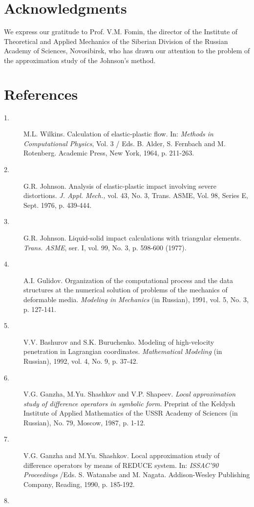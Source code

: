 \section*{Acknowledgments}
\hspace{6mm}
   We express our gratitude to Prof. V.M. Fomin, the director of the Institute
of Theoretical and Applied Mechanics of the Siberian Division of the Russian
Academy of Sciences, Novosibirsk, who has drawn our attention to the problem
of the approximation study of the Johnson's method.

\section*{References}
\begin{description}
\item[ 1.]
M.L. Wilkins. Calculation of elastic-plastic flow. In: {\em Methods in
Computational Physics}, Vol. 3 / Eds. B. Alder, S. Fernbach and M. Rotenberg.
Academic Press, New York, 1964, p. 211-263.
\item[ 2.]
G.R. Johnson. Analysis of elastic-plastic impact involving severe
distortions. {\em J. Appl. Mech.,} vol. 43, No. 3, Trans. ASME, Vol. 98,
Series E, Sept. 1976, p. 439-444.
\item[ 3.]
G.R. Johnson. Liquid-solid impact calculations with triangular elements.
{\em Trans. ASME}, ser. I, vol. 99, No. 3, p. 598-600 (1977).
\item[ 4.]
A.I. Gulidov. Organization of the computational process and the data
structures at the numerical solution of problems of the mechanics of deformable
media. {\em Modeling in Mechanics} (in Russian), 1991, vol. 5, No. 3, p. 127-141.
\item[ 5.]
V.V. Bashurov and S.K. Buruchenko. Modeling of high-velocity penetration in
Lagrangian coordinates. {\em Mathematical Modeling} (in Russian), 1992, vol. 4,
No. 9, p. 37-42.
\item[ 6.]
V.G. Ganzha, M.Yu. Shashkov and V.P. Shapeev. {\em Local approximation study
of difference operators in symbolic form}. Preprint of the Keldysh Institute
of Applied Mathematics of the USSR Academy of Sciences (in Russian), No. 79,
Moscow, 1987, p. 1-12.
\item[ 7.]
V.G. Ganzha and M.Yu. Shashkov. Local approximation study
of difference operators by means of REDUCE system. In: {\em ISSAC'90
Proceedings} /Eds. S. Watanabe and M. Nagata. Addison-Wesley Publishing
Company, Reading, 1990, p. 185-192.
\item[ 8.]

\end{description}
